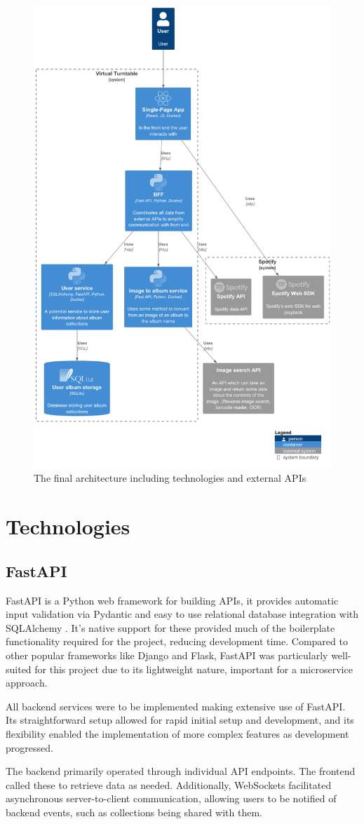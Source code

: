 \begin{figure} [H]
    \centering
    \includegraphics[width=0.5\linewidth]{figures/final_arch.png}
    \caption{The final architecture including technologies and external APIs}
    \label{fig:final-arch}
\end{figure}


\section{Technologies}
\subsection{FastAPI}
FastAPI is a Python web framework for building APIs, it provides automatic input validation via Pydantic and easy to use relational database integration with SQLAlchemy \cite{FastAPI}. It's native support for these provided much of the boilerplate functionality required for the project, reducing development time. Compared to other popular frameworks like Django and Flask, FastAPI was particularly well-suited for this project due to its lightweight nature, important for a microservice approach.

All backend services were to be implemented making extensive use of FastAPI. Its straightforward setup allowed for rapid initial setup and development, and its flexibility enabled the implementation of more complex features as development progressed.

The backend primarily operated through individual API endpoints. The frontend called these to retrieve data as needed. Additionally, WebSockets facilitated asynchronous server-to-client communication, allowing users to be notified of backend events, such as collections being shared with them.

